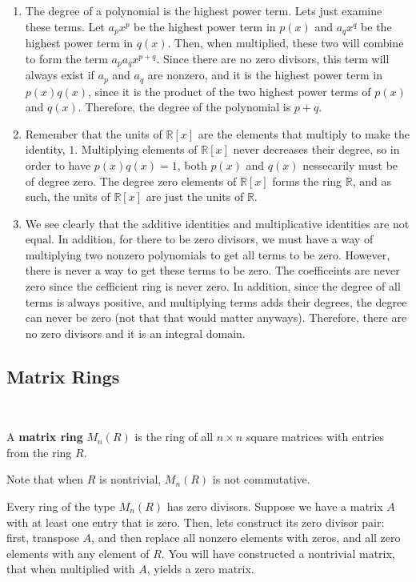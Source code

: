 \documentclass{article}
\begin{document}
\begin{customproof}
\begin{enumerate}
    \item The degree of a polynomial is the highest power term. Lets just examine these terms. Let $a_px^p$ be the highest power term in $p(x)$ and $a_qx^q$ be the highest power term in $q(x)$. Then, when multiplied, these two will combine to form the term $a_pa_qx^{p+q}$. Since there are no zero divisors, this term will always exist if $a_p$ and $a_q$ are nonzero, and it is the highest power term in $p(x)q(x)$, since it is the product of the two highest power terms of $p(x)$ and $q(x)$. Therefore, the degree of the polynomial is $p+q$. 
    \item Remember that the units of $\mathbb{R}[x]$ are the elements that multiply to make the identity, $1$. Multiplying elements of $\mathbb{R}[x]$ never decreases their degree, so in order to have $p(x)q(x) = 1$, both $p(x)$ and $q(x)$ nessecarily must be of degree zero. The degree zero elements of $\mathbb{R}[x]$ forms the ring $\mathbb{R}$, and as such, the units of $\mathbb{R}[x]$ are just the units of $\mathbb{R}$.
    \item We see clearly that the additive identities and multiplicative identities are not equal. In addition, for there to be zero divisors, we must have a way of multiplying two nonzero polynomials to get all terms to be zero. However, there is never a way to get these terms to be zero. The coefficeints are never zero since the cefficient ring is never zero. In addition, since the degree of all terms is always positive, and multiplying terms adds their degrees, the degree can never be zero (not that that would matter anyways). Therefore, there are no zero divisors and it is an integral domain.
\end{enumerate}
\end{customproof}

\subsection{Matrix Rings}
\ 
\begin{definition}
A \textbf{matrix ring} $M_n(R)$ is the ring of all $n\times n$ square matrices with entries from the ring $R$.

Note that when $R$ is nontrivial, $M_n(R)$ is not commutative. 
\end{definition}

Every ring of the type $M_n(R)$ has zero divisors. Suppose we have a matrix $A$ with at least one entry that is zero. Then, lets construct its zero divisor pair: first, transpose $A$, and then replace all nonzero elements with zeros, and all zero elements with any element of $R$. You will have constructed a nontrivial matrix, that when multiplied with $A$, yields a zero matrix.
\end{document}
